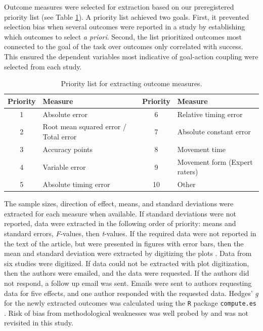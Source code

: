 \documentclass[man,floatsintext,letterpaper,12pt]{apa7}
\begin{document}
Outcome measures were selected for extraction based on our preregistered priority list (see Table \ref{tab:table1}). A priority list achieved two goals. First, it prevented selection bias when several outcomes were reported in a study by establishing which outcomes to select \emph{a priori}. Second, the list prioritized outcomes most connected to the goal of the task over outcomes only correlated with success. This ensured the dependent variables most indicative of goal-action coupling were selected from each study.

\begin{table}[t]
    \caption{Priority list for extracting outcome measures.}
    \label{tab:table1}
    \small
    \begin{tabular}{@{}clcl@{}}
        \toprule
        Priority & Measure & Priority & Measure \\
        \midrule
        1 & Absolute error & 6 & Relative timing error \\
        2 & Root mean squared error / Total error & 7 & Absolute constant error \\
        3 & Accuracy points & 8 & Movement time \\
        4 & Variable error & 9 & Movement form (Expert raters) \\
        5 & Absolute timing error & 10 & Other \\
        \bottomrule
    \end{tabular}
\end{table}

The sample sizes, direction of effect, means, and standard deviations were extracted for each measure when available. If standard deviations were not reported, data were extracted in the following order of priority: means and standard errors, \emph{F}-values, then \emph{t}-values. If the required data were not reported in the text of the article, but were presented in figures with error bars, then the mean and standard deviation were extracted by digitizing the plots \autocite{rohatgi2022}. Data from six studies were digitized. If data could not be extracted with plot digitization, then the authors were emailed, and the data were requested. If the authors did not respond, a follow up email was sent. Emails were sent to authors requesting data for five effects, and one author responded with the requested data. Hedges' \emph{g} for the newly extracted outcomes was calculated using the \texttt{R} package \texttt{compute.es} \autocite{R-compute.es}. Risk of bias from methodological weaknesses was well probed by \textcite{chua2021} and was not revisited in this study.
\end{document}
